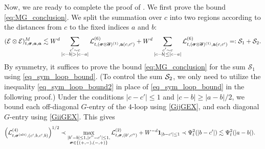 Now, we are ready to complete the proof of . We first prove the bound \eqref{eq:MG_conclusion}. We split the summation over $c$ into two regions according to the distances from $c$ to the fixed indices $a$ and $b$: 
\begin{equation}\label{eq:S1+S2}
    (\mathcal{E} \otimes \mathcal{E})_{t, \bsig, \boldsymbol{a}, \boldsymbol{a}}^M \lesssim  W^d \sum_{\substack{c'\sim c \\ |c-b|> |c-a|}}  \mathcal{L}^{(6)}_{t, (\bsig\otimes \overline\bsig)^{(1)}, \ba(c,c')} + W^d \sum_{\substack{c'\sim c\\ |c-b|\le |c-a|}} \mathcal{L}^{(6)}_{t, (\bsig\otimes \overline\bsig)^{(1)}, \ba(c,c')} =: \mathcal{S}_1 + \mathcal{S}_2.
\end{equation}
By symmetry, it suffices to prove the bound \eqref{eq:MG_conclusion} for the sum $\mathcal{S}_1$ using \eqref{eq_sym_loop_bound}. (To control the sum $\cal S_2$, we only need to utilize the inequality \eqref{eq_sym_loop_bound2} in place of \eqref{eq_sym_loop_bound} in the following proof.) 
Under the conditions \(|c-c'|\le 1\) and \(|c-b| \ge |a-b|/2\), we bound each off-diagonal $G$-entry of the $4$-loop  using \eqref{GijGEX}, and each diagonal $G$-entry using \eqref{GiiGEX}. This gives
\begin{align}\label{eq:pointwise_loop}
\p{ \mathcal{L}^{(4)}_{t,\bsig^{(\alt)}, (c',b,c',b)}}^{1/2} &\prec  \max_{\substack{|b'-b|\le 1,|c''-c'|\le 1,\\ \bsig\in \{(+,-),(-,+)\}}}\mathcal{L}^{(2)}_{t,\bsig, (b',c'')}+W^{-d}\mathbf 1_{|b-c'|\le 1}\prec \Psi_t^2(|b-c'|) \lesssim \Psi_t^2(|a-b|).
\end{align}
